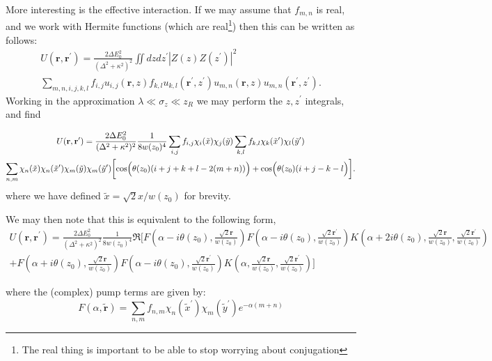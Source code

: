 \documentclass[twocolumn]{revtex4-1}
\renewcommand{\vec}[1]{\mathbf{#1}}
\newcommand{\tvr}{\tilde{\vec{r}}}
\begin{document}
More interesting is the effective interaction. If we may assume that
$f_{m,n}$ is real, and we work with Hermite functions (which are
real\footnote{The real thing is important to be able to stop worrying
  about conjugation}) then this can be written as follows:
\begin{multline}
  U(\vec{r}, \vec{r}^\prime)
  = \frac{2 \Delta E_0^2}{(\Delta^2+\kappa^2)^2}
  \iint dz dz^\prime |Z(z) Z(z^\prime)|^2
  \\
  \sum_{m,n,i,j,k,l}
  f_{i,j} u_{i,j}(\vec{r}, z)
  f_{k,l} u_{k,l}(\vec{r}^\prime, z^\prime)
  u_{m,n}(\vec{r},z)
  u_{m,n}(\vec{r}^\prime,z^\prime).
\end{multline}
Working in the approximation $\lambda \ll \sigma_z \ll z_R$ we may perform
the $z, z^\prime$ integrals, and find
\begin{widetext}
\begin{multline}
  U(\vec{r}, \vec{r}^\prime)
  = \frac{2 \Delta E_0^2}{(\Delta^2+\kappa^2)^2}
  \frac{1}{8w(z_0)^4}
  \sum_{i,j}  f_{i,j} \chi_i(\tilde{x}) \chi_j(\tilde{y})
  \sum_{k,l}f_{k,l} \chi_k(\tilde{x}^\prime) \chi_l(\tilde{y}^\prime)
  \\
  \sum_{n,m}
  \chi_n(\tilde{x}) 
  \chi_n(\tilde{x}^\prime) 
  \chi_m(\tilde{y})
  \chi_m(\tilde{y}^\prime)
  \biggl[
    \cos\Bigl( \theta(z_0) (i+j+k+l - 2(m+n))  \Bigr)
    +
    \cos\Bigl( \theta(z_0) (i+j-k-l  \Bigr)
  \biggr].
\end{multline}
where we have defined $\tilde{x} = \sqrt{2} x/w(z_0)$ for brevity.

We may then note that this is equivalent to the following form,
\begin{multline}
  U(\vec{r}, \vec{r}^\prime)
  = \frac{2 \Delta E_0^2}{(\Delta^2+\kappa^2)^2}
  \frac{1}{8w(z_0)^4}
  \Re\Biggl[
    F\left(\alpha-i\theta(z_0), \frac{\sqrt{2}\vec{r}}{w(z_0)}\right) 
    F\left(\alpha-i\theta(z_0),\frac{\sqrt{2}\vec{r^\prime}}{w(z_0)}\right) 
    K\left(\alpha+2i\theta(z_0), \frac{\sqrt{2}\vec{r}}{w(z_0)}, \frac{\sqrt{2}\vec{r}^\prime}{w(z_0)}\right)
    \\+
    F\left(\alpha+i\theta(z_0), \frac{\sqrt{2}\vec{r}}{w(z_0)}\right) 
    F\left(\alpha-i\theta(z_0),\frac{\sqrt{2}\vec{r}^\prime}{w(z_0)}\right)
    K\left(\alpha, \frac{\sqrt{2}\vec{r}}{w(z_0)}, \frac{\sqrt{2}\vec{r}^\prime}{w(z_0)}\right)
    \Biggr]
\end{multline}
\end{widetext}
where the (complex) pump terms are given by:
\begin{equation}
  \label{eq:3}
  F(\alpha, \tvr) 
  =
  \sum_{n,m}f_{n,m} \chi_n(\tilde{x}^\prime) \chi_m(\tilde{y}^\prime)
  e^{-\alpha(m+n)}
\end{equation}
\end{document}
